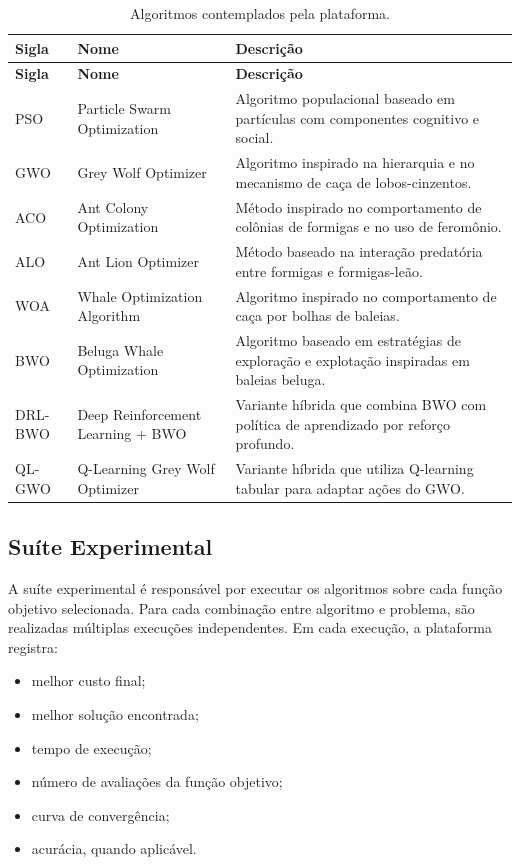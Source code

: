 \begin{longtable}{p{2.2cm} p{5.0cm} p{6.0cm}}
\caption{Algoritmos contemplados pela plataforma.}
\label{tab:algoritmos-plataforma}\\
\toprule
\textbf{Sigla} & \textbf{Nome} & \textbf{Descrição}\\
\midrule
\endfirsthead
\toprule
\textbf{Sigla} & \textbf{Nome} & \textbf{Descrição}\\
\midrule
\endhead
PSO & Particle Swarm Optimization & Algoritmo populacional baseado em partículas com componentes cognitivo e social.\\
GWO & Grey Wolf Optimizer & Algoritmo inspirado na hierarquia e no mecanismo de caça de lobos-cinzentos.\\
ACO & Ant Colony Optimization & Método inspirado no comportamento de colônias de formigas e no uso de feromônio.\\
ALO & Ant Lion Optimizer & Método baseado na interação predatória entre formigas e formigas-leão.\\
WOA & Whale Optimization Algorithm & Algoritmo inspirado no comportamento de caça por bolhas de baleias.\\
BWO & Beluga Whale Optimization & Algoritmo baseado em estratégias de exploração e explotação inspiradas em baleias beluga.\\
DRL-BWO & Deep Reinforcement Learning + BWO & Variante híbrida que combina BWO com política de aprendizado por reforço profundo.\\
QL-GWO & Q-Learning Grey Wolf Optimizer & Variante híbrida que utiliza Q-learning tabular para adaptar ações do GWO.\\
\bottomrule
\end{longtable}

\subsection{Suíte Experimental}

A suíte experimental é responsável por executar os algoritmos sobre cada função objetivo selecionada. Para cada combinação entre algoritmo e problema, são realizadas múltiplas execuções independentes. Em cada execução, a plataforma registra:

\begin{itemize}
    \item melhor custo final;
    \item melhor solução encontrada;
    \item tempo de execução;
    \item número de avaliações da função objetivo;
    \item curva de convergência;
    \item acurácia, quando aplicável.
\end{itemize}

